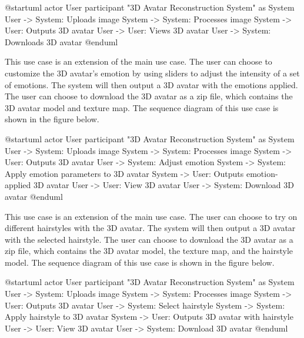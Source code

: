 \begin{umlfigure}
    @startuml
    actor User
    participant "3D Avatar Reconstruction System" as System
    User -> System: Uploads image
    System -> System: Processes image
    System -> User: Outputs 3D avatar
    User -> User: Views 3D avatar
    User -> System: Downloads 3D avatar
    @enduml
\end{umlfigure}



This use case is an extension of the main use case. The user can choose to customize the 3D avatar's emotion by using sliders to adjust the intensity of a set of emotions. The system will then output a 3D avatar with the emotions applied. The user can choose to download the 3D avatar as a zip file, which contains the 3D avatar model and texture map. The sequence diagram of this use case is shown in the figure below.

\begin{umlfigure}
    @startuml
    actor User
    participant "3D Avatar Reconstruction System" as System
    User -> System: Uploads image
    System -> System: Processes image
    System -> User: Outputs 3D avatar
    User -> System: Adjust emotion
    System -> System: Apply emotion parameters to 3D avatar
    System -> User: Outputs emotion-applied 3D avatar
    User -> User: View 3D avatar
    User -> System: Download 3D avatar
    @enduml

\end{umlfigure}


This use case is an extension of the main use case. The user can choose to try on different hairstyles with the 3D avatar. The system will then output a 3D avatar with the selected hairstyle. The user can choose to download the 3D avatar as a zip file, which contains the 3D avatar model, the texture map, and the hairstyle model. The sequence diagram of this use case is shown in the figure below.

\clearpage

\begin{umlfigure}
    @startuml
    actor User
    participant "3D Avatar Reconstruction System" as System
    User -> System: Uploads image
    System -> System: Processes image
    System -> User: Outputs 3D avatar
    User -> System: Select hairstyle
    System -> System: Apply hairstyle to 3D avatar
    System -> User: Outputs 3D avatar with hairstyle
    User -> User: View 3D avatar
    User -> System: Download 3D avatar
    @enduml
\end{umlfigure}

